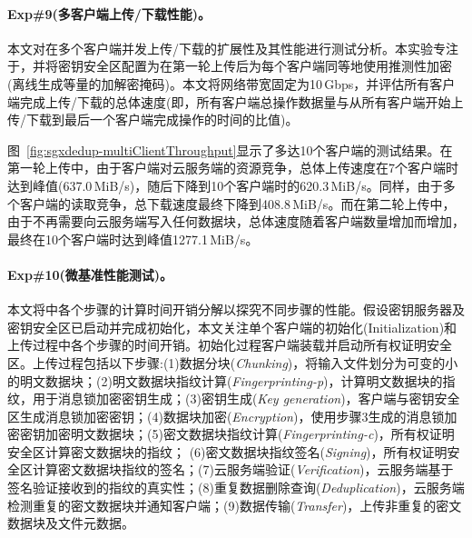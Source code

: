 \paragraph*{Exp\#9(多客户端上传/下载性能)。}本文对\sysnameS 在多个客户端并发上传/下载的扩展性及其性能进行测试分析。本实验专注于\sysnameS，并将密钥安全区配置为在第一轮上传后为每个客户端同等地使用推测性加密(离线生成等量的加解密掩码)。本文将网络带宽固定为10\,Gbps，并评估所有客户端完成上传/下载的总体速度(即，所有客户端总操作数据量与从所有客户端开始上传/下载到最后一个客户端完成操作的时间的比值)。

图~\ref{fig:sgxdedup-multiClientThroughput}显示了多达10个客户端的测试结果。在第一轮上传中，由于客户端对云服务端的资源竞争，总体上传速度在7个客户端时达到峰值(637.0\,MiB/s)，随后下降到10个客户端时的620.3\,MiB/s。同样，由于多个客户端的读取竞争，总下载速度最终下降到408.8\,MiB/s。而在第二轮上传中，由于不再需要向云服务端写入任何数据块，总体速度随着客户端数量增加而增加，最终在10个客户端时达到峰值1277.1\,MiB/s。

\paragraph*{Exp\#10(微基准性能测试)。}本文将\sysnameS 中各个步骤的计算时间开销分解以探究不同步骤的性能。假设密钥服务器及密钥安全区已启动并完成初始化，本文关注单个客户端的初始化(Initialization)和上传过程中各个步骤的时间开销。初始化过程客户端装载并启动所有权证明安全区。上传过程包括以下步骤:(1)数据分块(\textit{Chunking})，将输入文件划分为可变的小的明文数据块；(2)明文数据块指纹计算(\textit{Fingerprinting-p})，计算明文数据块的指纹，用于消息锁加密密钥生成；(3)密钥生成(\textit{Key generation})，客户端与密钥安全区生成消息锁加密密钥；(4)数据块加密(\textit{Encryption})，使用步骤3生成的消息锁加密密钥加密明文数据块；(5)密文数据块指纹计算(\textit{Fingerprinting-c})，所有权证明安全区计算密文数据块的指纹； (6)密文数据块指纹签名(\textit{Signing})，所有权证明安全区计算密文数据块指纹的签名；(7)云服务端验证(\textit{Verification})，云服务端基于签名验证接收到的指纹的真实性；(8)重复数据删除查询(\textit{Deduplication})，云服务端检测重复的密文数据块并通知客户端；(9)数据传输(\textit{Transfer})，上传非重复的密文数据块及文件元数据。


